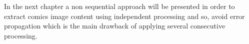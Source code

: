 

In the next chapter a non sequential approach will be presented in order to extract comics image content using independent processing and so, avoid error propagation which is the main drawback of applying several consecutive processing.



